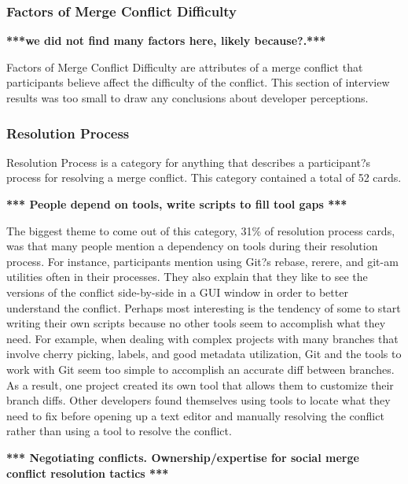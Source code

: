 \documentclass[conference]{IEEEtran}
\begin{document}
\subsubsection{Factors of Merge Conflict Difficulty}

\textbf{***we did not find many factors here, likely because?.***}

Factors of Merge Conflict Difficulty are attributes of a merge conflict that participants believe affect the difficulty of the conflict. This section of interview results was too small to draw any conclusions about developer perceptions.

\subsubsection{Resolution Process}

Resolution Process is a category for anything that describes a participant?s process for resolving a merge conflict. This category contained a total of 52 cards.

\textbf{*** People depend on tools, write scripts to fill tool gaps ***}

The biggest theme to come out of this category, 31\% of resolution process cards, was that many people mention a dependency on tools during their resolution process. For instance, participants mention using Git?s rebase, rerere, and git-am utilities often in their processes. They also explain that they like to see the versions of the conflict side-by-side in a GUI window in order to better understand the conflict. Perhaps most interesting is the tendency of some to start writing their own scripts because no other tools seem to accomplish what they need. For example, when dealing with complex projects with many branches that involve cherry picking, labels, and good metadata utilization, Git and the tools to work with Git seem too simple to accomplish an accurate diff between branches. As a result, one project created its own tool that allows them to customize their branch diffs. Other developers found themselves using tools to locate what they need to fix before opening up a text editor and manually resolving the conflict rather than using a tool to resolve the conflict.

\textbf{*** Negotiating conflicts. Ownership/expertise for social merge conflict resolution tactics ***}
\end{document}

